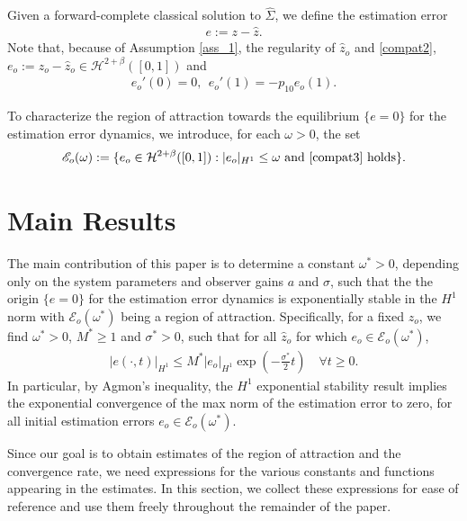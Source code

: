 \documentclass[twocolumn]{autart}
\begin{document}
Given a forward-complete classical solution to $\hat{\Sigma}$, we define the estimation error 
\begin{align}
e := z-\hat{z}. \label{est_err}
\end{align}
Note that, because of Assumption \ref{ass_1}, the regularity of $\hat{z}_o$ and \eqref{compat2}, $e_o := z_o-\hat{z}_o \in \mathscr{H}^{2+\beta}([0,1])$ and 
\begin{align}
e_o'(0)=0, \ \ e_o'(1)=-p_{10}e_o(1). \label{compat3}
\end{align}

To characterize the region of attraction towards the equilibrium $\{e=0\}$ for the estimation error dynamics, we introduce, for each $\omega>0$, the set 
\begin{align*}
\mathscr{E}_o(\omega) := \{e_o\in \mathcal{H}^{2+\beta}([0,1]): |e_o|_{H^1} \leq \omega \ \text{and \eqref{compat3} holds}\}. 
\end{align*}



\section{Main Results}\label{main_result}

The main contribution of this paper is to determine a constant $\omega^*>0$, depending only on the system parameters and observer gains $a$ and $\sigma$, such that the the origin $\{e=0\}$ for the estimation error dynamics is exponentially stable in the $H^1$ norm with $\mathscr{E}_o(\omega^*)$ being a region of attraction. Specifically, for a fixed $z_o$, we find $\omega^*>0$, $M^*\geq 1$ and $\sigma^*>0$, such that for all $\hat{z}_o$ for which $e_o\in \mathscr{E}_o(\omega^*)$,
\begin{align}
|e(\cdot,t)|_{H^1}\leq M^* |e_o|_{H^1} \exp\left(-\frac{\sigma^*}{2} t\right) \quad \forall t\geq 0.
\end{align}
In particular, by Agmon's inequality, the $H^1$ exponential stability result implies the exponential convergence of the max norm of the estimation error to zero, for all initial estimation errors $e_o\in \mathscr{E}_o(\omega^*)$. 

Since our goal is to obtain estimates of the region of attraction and the convergence rate, we need expressions for the various constants and functions appearing in the estimates. In this section, we collect these expressions for ease of reference and use them freely throughout the remainder of the paper.
\end{document}

